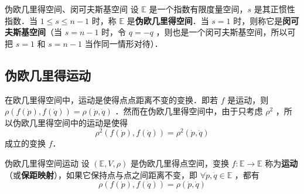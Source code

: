 \begin{definition}{伪欧几里得空间、闵可夫斯基空间}
设 $\mathbb E$ 是一个指数有限度量空间，$s$ 是其正惯性指数．当 $1\leq s\leq n-1$ 时，称 $\mathbb E$ 是\textbf{伪欧几里得空间}．当 $s=1$ 时，则称它是\textbf{闵可夫斯基空间}（当 $s=n-1$ 时，令 $q=-q$ ，则也是一个闵可夫斯基空间，所以可把 $s=1$ 和 $s=n-1$ 当作同一情形对待）．
\end{definition}
\subsection{伪欧几里得运动}
在欧几里得空间中，运动是使得点点距离不变的变换．即若 $f$ 是运动，则 $\rho(f(\dot p),f(\dot q))=\rho(\dot p,\dot q)$ ．然而在伪欧几里得空间中，由于只考虑 $\rho^2$ ，所以伪欧几里得空间中的运动是使得
\begin{equation}
\rho^2(f(\dot p),f(\dot q))=\rho^2(\dot p,\dot q)
\end{equation}
成立的变换 $f$．
\begin{definition}{伪欧几里得空间运动}
设 $(\mathbb E,V,\rho)$ 是伪欧几里得点空间，变换 $f:\mathbb E\rightarrow\mathbb E$ 称为\textbf{运动}（或\textbf{保距映射}），如果它保持点与点之间距离不变，即 $\forall \dot p,\dot q\in\mathbb E$ ，都有
\begin{equation}
\rho(f(\dot p),f(\dot q))=\rho(\dot p,\dot q)
\end{equation}
\end{definition}
